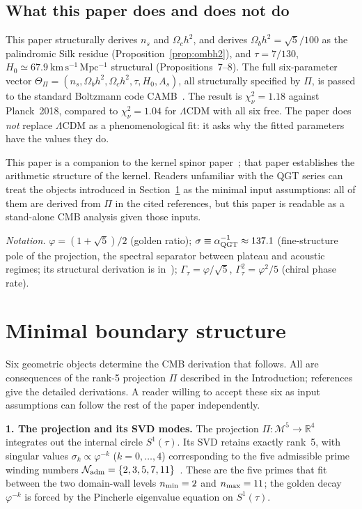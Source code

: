 \documentclass[twocolumn,10pt]{article}
\newcommand{\vp}{\varphi}
\newcommand{\Mfive}{\mathcal{M}^5}
\newcommand{\Rfour}{\mathbb{R}^4}
\newcommand{\Gt}{\Gamma_\tau}
\newcommand{\Nadm}{\mathcal{N}_{\rm adm}}
\begin{document}
\subsection*{What this paper does and does not do}

This paper structurally derives $n_s$ and $\Omega_ch^2$, and
derives $\Omega_bh^2=\sqrt{5}/100$ as the palindromic Silk residue
(Proposition~\ref{prop:ombh2}),
and $\tau=7/130$, $H_0\simeq67.9~\mathrm{km\,s^{-1}\,Mpc^{-1}}$
structural (Propositions~7--8).
The full six-parameter vector
$\Theta_\Pi=(n_s,\Omega_bh^2,\Omega_ch^2,\tau,H_0,A_s)$,
all structurally specified by $\Pi$,
is passed
to the standard Boltzmann code CAMB~\cite{CAMB}. The result is
$\chi^2_\nu=1.18$ against Planck~2018, compared to
$\chi^2_\nu=1.04$ for $\Lambda$CDM with all six free.
The paper does \emph{not} replace $\Lambda$CDM as a phenomenological
fit: it asks why the fitted parameters have the values they do.

This paper is a companion to the kernel spinor
paper~\cite{CamKer163}; that paper establishes the arithmetic
structure of the kernel. Readers unfamiliar with the QGT series can
treat the objects introduced in Section~\ref{sec:boundary} as the
minimal input assumptions: all of them are derived from $\Pi$ in the
cited references, but this paper is readable as a stand-alone CMB
analysis given those inputs.

\smallskip\noindent\textit{Notation.}
$\vp=(1+\sqrt{5})/2$ (golden ratio);
$\sigma\equiv\alpha^{-1}_{\rm QGT}\approx137.1$ (fine-structure
pole of the projection, the spectral separator between plateau and
acoustic regimes; its structural derivation is in~\cite{CamP14});
$\Gt=\vp/\sqrt{5}$, $\Gt^2=\vp^2/5$ (chiral phase rate).

\section{Minimal boundary structure}
\label{sec:boundary}

Six geometric objects determine the CMB derivation that follows.
All are consequences of the rank-5 projection $\Pi$ described in the
Introduction; references give the detailed derivations. A reader
willing to accept these six as input assumptions can follow the rest
of the paper independently.

\smallskip
\noindent\textbf{1. The projection and its SVD modes.}
The projection $\Pi:\Mfive\to\Rfour$ integrates out the internal
circle $S^1(\tau)$. Its SVD retains exactly rank~5, with singular
values $\sigma_k\propto\vp^{-k}$ ($k=0,\ldots,4$) corresponding to
the five admissible prime winding numbers
$\Nadm=\{2,3,5,7,11\}$~\cite{CamP01,CamP02}.
These are the five primes that fit between the two domain-wall levels
$n_{\rm min}=2$ and $n_{\rm max}=11$; the golden decay $\vp^{-k}$
is forced by the Pincherle eigenvalue equation on $S^1(\tau)$.
\end{document}

